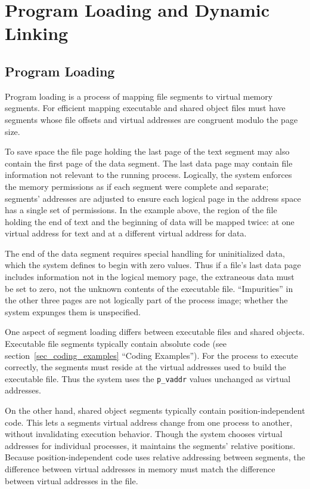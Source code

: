 \chapter{Program Loading and Dynamic Linking}

\section{Program Loading}

Program loading is a process of mapping file segments to virtual
memory segments. For efficient mapping executable and shared object
files must have segments whose file offsets and virtual addresses are
congruent modulo the page size.

To save space the file page holding the last page of the text segment
may also contain the first page of the data segment. The last data
page may contain file information not relevant to the running process.
Logically, the system enforces the memory permissions as if each
segment were complete and separate; segments' addresses are adjusted
to ensure each logical page in the address space has a single set of
permissions. In the example above, the region of the file holding the
end of text and the beginning of data will be mapped twice: at one
virtual address for text and at a different virtual address for data.
 
The end of the data segment requires special handling for
uninitialized data, which the system defines to begin with zero
values. Thus if a file's last data page includes information not in
the logical memory page, the extraneous data must be set to zero, not
the unknown contents of the executable file. ``Impurities'' in the
other three pages are not logically part of the process image; whether
the system expunges them is unspecified.

One aspect of segment loading differs between executable files and
shared objects. Executable file segments typically contain absolute
code (see section~\ref{sec_coding_examples} ``Coding Examples'').
For the process to
execute correctly, the segments must reside at the virtual addresses
used to build the executable file. Thus the system uses the {\tt p_vaddr}
values unchanged as virtual addresses.

On the other hand, shared object segments typically contain
position-independent code. This lets a segments virtual address
change from one process to another, without invalidating execution
behavior. Though the system chooses virtual addresses for individual
processes, it maintains the segments' relative positions. Because
position-independent code uses relative addressing between segments,
the difference between virtual addresses in memory must match the
difference between virtual addresses in the file.

